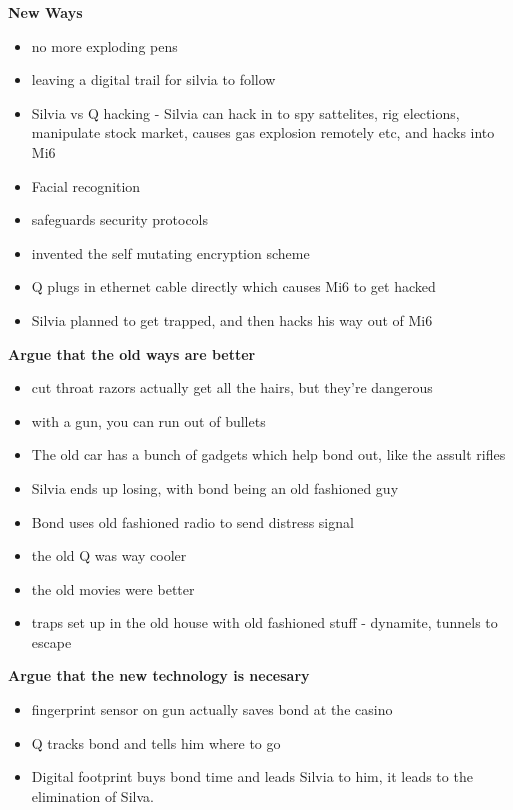 \documentclass{article}
\begin{document}
    \textbf{New Ways}
    \begin{itemize}
      \item no more exploding pens
      \item leaving a digital trail for silvia to follow
      \item Silvia vs Q hacking - Silvia can hack in to spy sattelites, rig elections, manipulate stock market, causes gas explosion remotely etc, and hacks into Mi6
      \item Facial recognition
      \item safeguards security protocols
      \item invented the self mutating encryption scheme
      \item Q plugs in ethernet cable directly which causes Mi6 to get hacked
      \item Silvia planned to get trapped, and then hacks his way out of Mi6
    \end{itemize}


    \textbf{Argue that the old ways are better}
    \begin{itemize}
      \item cut throat razors actually get all the hairs, but they're dangerous
      \item with a gun, you can run out of bullets
      \item The old car has a bunch of gadgets which help bond out, like the assult rifles
      \item Silvia ends up losing, with bond being an old fashioned guy
      \item Bond uses old fashioned radio to send distress signal
      \item the old Q was way cooler
      \item the old movies were better
      \item traps set up in the old house with old fashioned stuff - dynamite, tunnels to escape

    \end{itemize}

    \textbf{Argue that the new technology is necesary}
    \begin{itemize}
      \item fingerprint sensor on gun actually saves bond at the casino
      \item Q tracks bond and tells him where to go
      \item Digital footprint buys bond time and leads Silvia to him, it leads to the elimination of Silva.
    \end{itemize}
\end{document}
